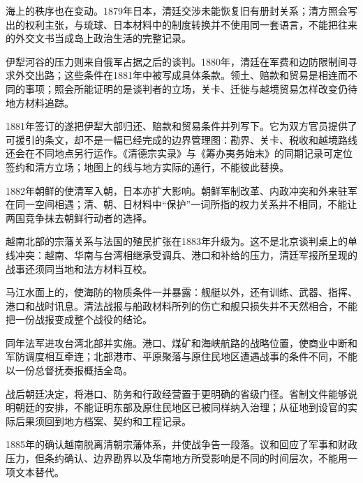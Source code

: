海上的秩序也在变动。1879年日本，清廷交涉未能恢复旧有册封关系；清方照会写出的权利主张，与琉球、日本材料中的制度转换并不使用同一套语言，不能把往来的外交文书当成岛上政治生活的完整记录。


伊犁河谷的压力则来自俄军占据之后的谈判。1880年，清廷在军费和边防限制间寻求外交出路；这些条件在1881年中被写成具体条款。领土、赔款和贸易是相连而不同的事项；照会所能证明的是谈判者的立场，关卡、迁徙与越境贸易怎样改变仍待地方材料追踪。


1881年签订的遂把伊犁大部归还、赔款和贸易条件并列写下。它为双方官员提供了可援引的条文，却不是一幅已经完成的边界管理图：勘界、关卡、税收和越境路线还会在不同地点另行运作。《清德宗实录》与《筹办夷务始末》的同期记录可定位签约和清方立场；地图上的线与地方实际的通行，不能彼此替换。

1882年朝鲜的使清军入朝，日本亦扩大影响。朝鲜军制改革、内政冲突和外来驻军在同一空间相遇；清、朝、日材料中“保护”一词所指的权力关系并不相同，不能让两国竞争抹去朝鲜行动者的选择。


越南北部的宗藩关系与法国的殖民扩张在1883年升级为。这不是北京谈判桌上的单线冲突：越南、华南与台湾相继承受调兵、港口和补给的压力，清廷军报所呈现的战事还须同当地和法方材料互校。


马江水面上的，使海防的物质条件一并暴露：舰艇以外，还有训练、武器、指挥、港口和战时讯息。清法战报与船政材料所列的伤亡和舰只损失并不天然相合，不能把一份战报变成整个战役的结论。


同年法军进攻台湾北部并实施。港口、煤矿和海峡航路的战略位置，使商业中断和军防调度相互牵连；北部港市、平原聚落与原住民地区遭遇战事的条件不同，不能以一份总督抚奏报概括全岛。

战后朝廷决定，将港口、防务和行政经营置于更明确的省级门径。省制文件能够说明朝廷的安排，不能证明东部及原住民地区已被同样纳入治理；从征地到设官的实际后果须回到地方档案、契约和工程记录。


1885年的确认越南脱离清朝宗藩体系，并使战争告一段落。议和回应了军事和财政压力，但条约确认、边界勘界以及华南地方所受影响是不同的时间层次，不能用一项文本替代。

